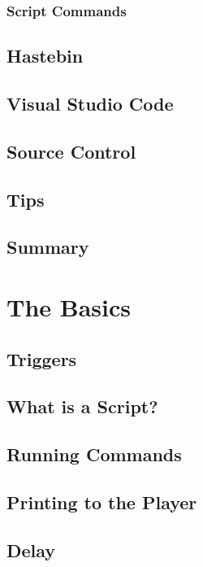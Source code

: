 \documentclass[oneside]{book}
\begin{document}
\subsection{Script Commands}

\section{Hastebin}
\blindtext

\section{Visual Studio Code}
\blindtext

\section{Source Control}
\blindtext

\section{Tips}
\blindtext

\section{Summary}
\blindtext

\chapter{The Basics}

\section{Triggers}
\blindtext

\section{What is a Script?}
\blindtext

\section{Running Commands}
\blindtext

\section{Printing to the Player}
\blindtext

\section{Delay}
\blindtext
\end{document}
